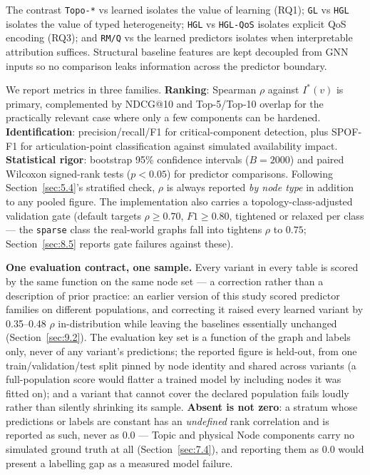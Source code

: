The contrast \texttt{Topo-*} vs learned isolates the value of learning (RQ1); \texttt{GL} vs
\texttt{HGL} isolates the value of typed heterogeneity; \texttt{HGL} vs \texttt{HGL-QoS} isolates
explicit QoS encoding (RQ3); and \texttt{RM/Q} vs the learned predictors isolates when
interpretable attribution suffices. Structural baseline features are kept decoupled from GNN inputs
so no comparison leaks information across the predictor boundary.

We report metrics in three families. \textbf{Ranking}: Spearman \(\rho\) against \(I^*(v)\) is
primary, complemented by NDCG@10 and Top-5/Top-10 overlap for the practically relevant case where
only a few components can be hardened. \textbf{Identification}: precision/recall/F1 for
critical-component detection, plus SPOF-F1 for articulation-point classification against simulated
availability impact. \textbf{Statistical rigor}: bootstrap 95\% confidence intervals (\(B = 2000\))
\cite{efron1993introduction,spearman1904proof} and paired Wilcoxon signed-rank tests
\cite{wilcoxon1945individual} (\(p < 0.05\)) for predictor comparisons. Following
Section~\ref{sec:5.4}'s stratified check, \(\rho\) is always reported \emph{by node type} in addition
to any pooled figure. The implementation also carries a topology-class-adjusted validation gate
(default targets \(\rho \ge 0.70\), \(F1 \ge 0.80\), tightened or relaxed per class --- the
\texttt{sparse} class the real-world graphs fall into tightens \(\rho\) to \(0.75\);
Section~\ref{sec:8.5} reports gate failures against these).

\textbf{One evaluation contract, one sample.} Every variant in every table is scored by the same
function on the same node set --- a correction rather than a description of prior practice: an
earlier version of this study scored predictor families on different populations, and correcting it
raised every learned variant by 0.35--0.48 \(\rho\) in-distribution while leaving the baselines
essentially unchanged (Section~\ref{sec:9.2}). The evaluation key set is a function of the graph and
labels only, never of any variant's predictions; the reported figure is held-out, from one
train/validation/test split pinned by node identity and shared across variants (a full-population
score would flatter a trained model by including nodes it was fitted on); and a variant that cannot
cover the declared population fails loudly rather than silently shrinking its sample. \textbf{Absent
is not zero}: a stratum whose predictions or labels are constant has an \emph{undefined} rank
correlation and is reported as such, never as \(0.0\) --- Topic and physical Node components carry no
simulated ground truth at all (Section~\ref{sec:7.4}), and reporting them as \(0.0\) would present a
labelling gap as a measured model failure.

